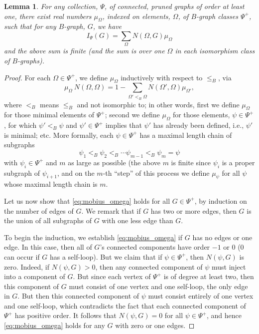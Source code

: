 \documentclass{memo-l}
\theoremstyle{plain}
\theoremstyle{definition}
\numberwithin{section}{chapter}
\numberwithin{equation}{chapter}
\theoremstyle{plain}
\newtheorem{lem}[theorem]{Lemma}
\theoremstyle{definition}
\begin{document}
\begin{lem} For any collection, $\Psi$, of connected, pruned graphs
of order at least
one, there exist real numbers 
$\mu_\Omega$, indexed on elements, $\Omega$, of $B$-graph classes $\Psi^+$, 
such that for any $B$-graph, $G$, we have
\begin{equation}\label{eq:mobius_omega}
I_\Psi(G) = 
\sum_{\Omega} N(\Omega,G)\mu_\Omega
\end{equation}
and the above sum is finite
(and the sum is over one $\Omega$ in each isomorphism class of $B$-graphs).
\end{lem}
\begin{proof}
For each $\Omega\in\Psi^+$, we define $\mu_\Omega$ inductively with
respect to $\le_B$, via
$$
\mu_\Omega \  N(\Omega,\Omega)  
= 1 - \sum_{\Omega'<_B\Omega} N(\Omega',\Omega) \mu_{\Omega'},
$$
where $<_B$ means $\le_B$ and not isomorphic to; in other words, first we
define $\mu_\Omega$ for those minimal elements of $\Psi^+$; second
we define $\mu_\Omega$ for those
elements, $\psi\in\Psi^+$, for which $\psi'<_B \psi$ and $\psi'\in\Psi^+$
implies that $\psi'$ has already been defined, i.e., $\psi'$ is minimal;
etc.
More formally, each $\psi\in\Psi^+$ has a maximal length chain
of subgraphs
$$
\psi_1<_B \psi_2 <_B \cdots \psi_{m-1} <_B  \psi_m=\psi
$$
with $\psi_i\in\Psi^+$ and $m$ as large as possible 
(the above $m$ is finite since $\psi_i$ is a proper subgraph
of $\psi_{i+1}$, and on the
$m$-th ``step'' of this process we define $\mu_\psi$ for all $\psi$ whose
maximal length chain is $m$.

Let us now show that \eqref{eq:mobius_omega} holds for all $G\in\Psi^+$,
by induction on the number of edges of $G$.  We remark that if $G$ has
two or more edges, then $G$ is the union of all subgraphs of $G$ with
one less edge than $G$.

To begin the induction, we establish \eqref{eq:mobius_omega} if
$G$ has no edges or one edge.
In this case,
then all
of $G$'s connected components have order $-1$ or $0$ ($0$ can occur
if $G$ has a self-loop).  But we claim that if $\psi\in\Psi^+$, then
$N(\psi,G)$ is zero.
Indeed, if $N(\psi,G)>0$, then any connected component of $\psi$ must inject
into a component of $G$.  But since each vertex of $\Psi^+$ is
of degree at least two, then this component of $G$ must consist of
one vertex and one self-loop, the only edge in $G$.  But then this
connected component of $\psi$ must consist entirely of one vertex and
one self-loop, which contradicts the fact that each connected component
of $\Psi^+$ has positive order.
It follows that $N(\psi,G)=0$ for all $\psi\in\Psi^+$, and hence
\eqref{eq:mobius_omega} holds for any $G$ with zero or one edges.


\end{proof}
\end{document}
